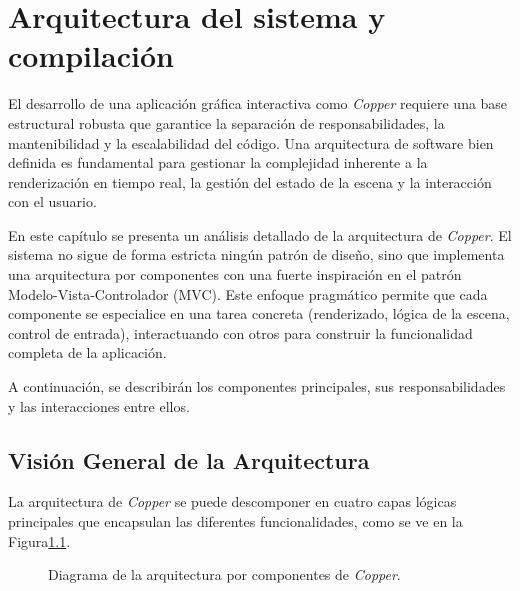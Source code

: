 \chapter{Arquitectura del sistema y compilación}

El desarrollo de una aplicación gráfica interactiva como \textit{Copper}
requiere una base estructural robusta que garantice la separación de
responsabilidades, la mantenibilidad y la escalabilidad del código. Una
arquitectura de software bien definida es fundamental para gestionar la
complejidad inherente a la renderización en tiempo real, la gestión del estado
de la escena y la interacción con el usuario.

En este capítulo se presenta un análisis detallado de la arquitectura de
\textit{Copper}. El sistema no sigue de forma estricta ningún patrón de diseño,
sino que implementa una arquitectura por componentes con una fuerte
inspiración en el patrón Modelo-Vista-Controlador (MVC). Este enfoque
pragmático permite que cada componente se especialice en una tarea concreta
(renderizado, lógica de la escena, control de entrada), interactuando con otros
para construir la funcionalidad completa de la aplicación.

A continuación, se describirán los componentes principales, sus
responsabilidades y las interacciones entre ellos.

\section{Visión General de la Arquitectura}

La arquitectura de \textit{Copper} se puede descomponer en cuatro capas lógicas
principales que encapsulan las diferentes funcionalidades, como se ve en la
Figura\ref{fig:diagrama_arquitectura}.

\begin{figure}[H]
    \centering
    \caption{Diagrama de la arquitectura por componentes de \textit{Copper}.}
    \label{fig:diagrama_arquitectura}
\end{figure}

